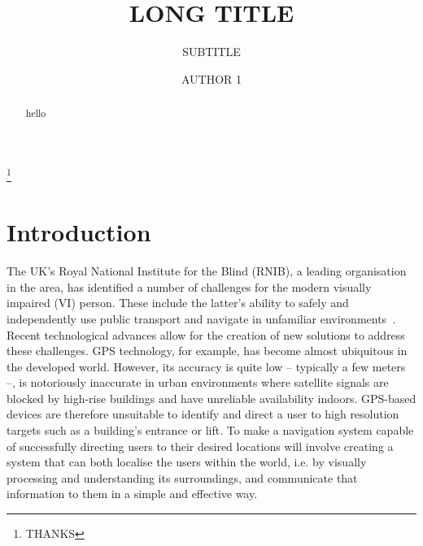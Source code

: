 \documentclass[format=sigconf, review=true, screen=true, anonymous=true]{acmart}
\begin{document}

\title[SHORT TITLE]{LONG TITLE}
\subtitle{SUBTITLE}

\author{AUTHOR 1}

\thanks{THANKS}



\begin{abstract}
  hello
\end{abstract}

\maketitle

\section{Introduction}

The UK's Royal National Institute for the Blind (RNIB), a leading organisation in the area, has identified a number of challenges for the modern visually impaired (VI) person. These include the latter's ability to safely and independently use public transport and navigate in unfamiliar environments~\cite{rnib-objectives}. Recent technological advances allow for the creation of new solutions to address these challenges. GPS technology, for example, has become almost ubiquitous in the developed world. However, its accuracy is quite low -- typically a few meters --, is notoriously inaccurate in urban environments where satellite signals are blocked by high-rise buildings and have unreliable availability indoors. GPS-based devices are therefore unsuitable to identify and direct a user to high resolution targets such as a building's entrance or lift. To make a navigation system capable of successfully directing users to their desired locations will involve creating a system that can both localise the users within the world, i.e. by visually processing and understanding its surroundings, and communicate that information to them in a simple and effective way.
\end{document}
